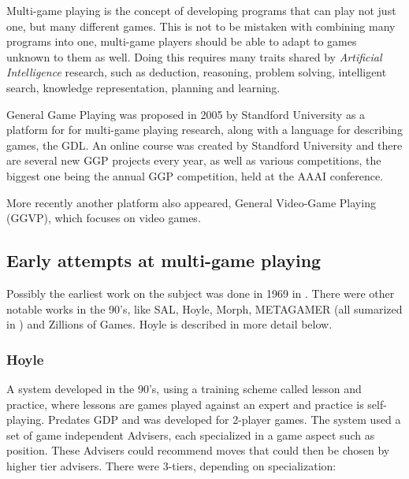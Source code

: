 Multi-game playing is the concept of developing programs that can play not just one, but many different games. This is not to be mistaken with combining many programs into one, multi-game players should be able to adapt to games unknown to them as well. Doing this requires many traits shared by \textit{Artificial Intelligence} research, such as deduction, reasoning, problem solving, intelligent search, knowledge representation, planning and learning.

General Game Playing was proposed in 2005 by Standford University as a platform for for multi-game playing research, along with a language for describing games, the \gls{GDL}. An online course was created by Standford University and there are several new GGP projects every year, as well as various competitions, the biggest one being the annual GGP competition, held at the AAAI conference.

More recently another platform also appeared, General Video-Game Playing (GGVP), which focuses on video games.

\subsection{Early attempts at multi-game playing}

Possibly the earliest work on the subject was done in 1969 in \cite{Pitrat1969}. There were other notable works in the 90's, like SAL, Hoyle, Morph, METAGAMER (all sumarized in \cite{Mandziuk2013}) and Zillions of Games. Hoyle is described in more detail below.

\subsubsection{Hoyle}
A system developed in the 90’s, using a training scheme called lesson and practice, where lessons are games played against an expert and practice is self-playing. Predates GDP and was developed for 2-player games. The system used a set of game independent Advisers, each specialized in a game aspect such as position. These Advisers could recommend moves that could then be chosen by higher tier advisers. There were 3-tiers, depending on specialization:

